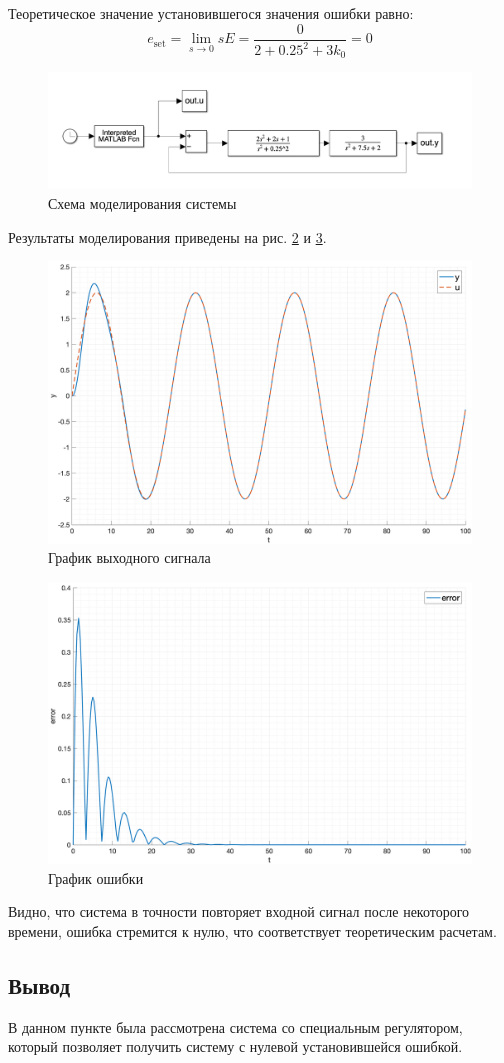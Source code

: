 Теоретическое значение установившегося значения ошибки равно:
\begin{equation}
    e_{\text{set}} = \lim_{s \to 0} sE = \frac{0}{2 + 0.25^2 + 3k_0} = 0
\end{equation}
\begin{figure}[ht!]
    \centering
    \includegraphics[width=\textwidth]{"media/scheme6.png"}
    \caption{Схема моделирования системы}
    \label{fig:task6_scheme}
\end{figure}
Результаты моделирования приведены на рис. \ref{fig:task6_out} и \ref{fig:task6_error}.
\begin{figure}[ht!]
    \centering
    \includegraphics[width=\textwidth]{media/plots/task6_out.png}
    \caption{График выходного сигнала}
    \label{fig:task6_out}
\end{figure}
\begin{figure}
    \centering
    \includegraphics[width=\textwidth]{media/plots/task6_error.png}
    \caption{График ошибки}
    \label{fig:task6_error}
\end{figure}
Видно, что система в точности повторяет входной сигнал после некоторого времени, ошибка
стремится к нулю, что соответствует теоретическим расчетам.

\subsection{Вывод}
В данном пункте была рассмотрена система со специальным регулятором, который позволяет
получить систему с нулевой установившейся ошибкой. 